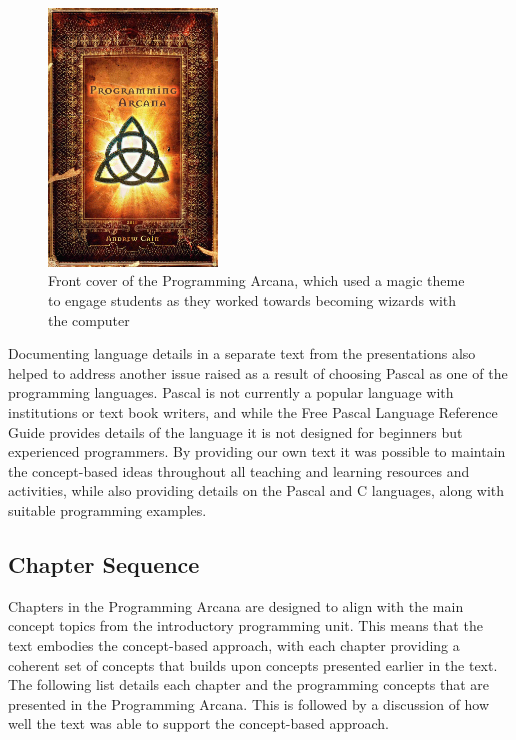 \begin{figure}[htbp]
  \centering
  \includegraphics[width=0.4\textwidth]{front_cover_final}
  \caption{Front cover of the Programming Arcana, which used a magic theme to engage students as they worked towards becoming wizards with the computer}
  \label{fig:front_cover_final}
\end{figure}

Documenting language details in a separate text from the presentations also helped to address another issue raised as a result of choosing Pascal as one of the programming languages. Pascal is not currently a popular language with institutions or text book writers, and while the Free Pascal Language Reference Guide \cite{FPC:2013lang} provides details of the language it is not designed for beginners but experienced programmers. By providing our own text it was possible to maintain the concept-based ideas throughout all teaching and learning resources and activities, while also providing details on the Pascal and C languages, along with suitable programming examples.


\subsection{Chapter Sequence} %
\label{ssub:chapter_sequence}

Chapters in the Programming Arcana are designed to align with the main concept topics from the introductory programming unit. This means that the text embodies the concept-based approach, with each chapter providing a coherent set of concepts that builds upon concepts presented earlier in the text. The following list details each chapter and the programming concepts that are presented in the Programming Arcana. This is followed by a discussion of how well the text was able to support the concept-based approach.

